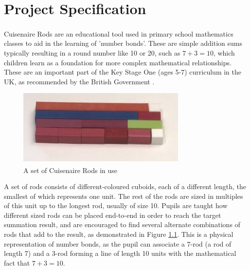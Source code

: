 \chapter{Project Specification}



Cuisenaire\textsuperscript{\textregistered} Rods \cite{TheCuise14:online} are an educational tool used in primary school mathematics classes to aid in the learning of 'number bonds'. These are simple addition sums typically resulting in a round number like 10 or 20, such as $7+3=10$, which children learn as a foundation for more complex mathematical relationships. These are an important part of the Key Stage One (ages 5-7) curriculum in the UK, as recommended by the British Government \cite{Mathemat26:online}. 

\begin{figure}[h] 
  \includegraphics[width=0.75\textwidth]{rods.JPG}
  \centering
  \caption{A set of Cuisenaire\textsuperscript{\textregistered} Rods in use \cite{24Lesnom77:online}}
  \label{fig:rods}
\end{figure}

A set of rods consists of different-coloured cuboids, each of a different length, the smallest of which represents one unit. The rest of the rods are sized in multiples of this unit up to the longest rod, usually of size 10. Pupils are taught how different sized rods can be placed end-to-end in order to reach the target summation result, and are encouraged to find several alternate combinations of rods that add to the result, as demonstrated in Figure \ref{fig:rods}. This is a physical representation of number bonds, as the pupil can associate a 7-rod (a rod of length 7) and a 3-rod forming a line of length 10 units with the mathematical fact that $7+3=10$. \\

